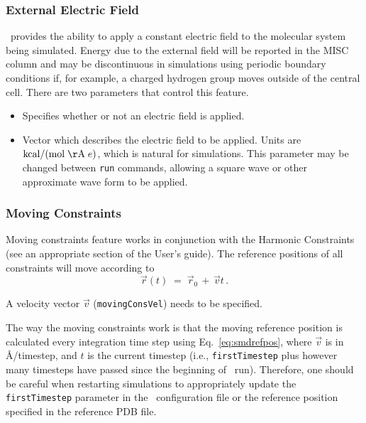 \subsubsection{External Electric Field}

\NAMD\ provides the ability to apply a constant electric field to the molecular
system being simulated.
Energy due to the external field will be reported in the MISC column
and may be discontinuous in simulations using periodic boundary conditions if,
for example, a charged hydrogen group moves outside of the central cell.
There are two parameters that control this feature.

\begin{itemize}

\item
{}
{Specifies whether or not an electric field is applied.}

\item
{}
{Vector which describes the electric field to be applied.
Units are ${\rm kcal} / ({\rm mol \; \AA} \; e)$, which is natural for simulations.
This parameter may be changed between {\tt run} commands, allowing a square
wave or other approximate wave form to be applied.}

\end{itemize}


\subsubsection{Moving Constraints}

Moving constraints feature works in conjunction with the Harmonic
Constraints (see an appropriate section of the User's guide).
The reference positions of all constraints
will move according to
\begin{equation}
\label{eq:smdrefpos}
   \vec r(t) \; = \; \vec r_0 \, + \, \vec v t \,.
\end{equation}

A velocity vector $\vec v$ ({\tt movingConsVel}) needs to be specified.

The way the moving constraints work is that the moving reference
position is calculated every integration time step using
Eq.~\ref{eq:smdrefpos}, where $\vec v$ is in \AA/timestep, and $t$ is the
current timestep (i.e., {\tt firstTimestep} plus however many
timesteps have passed since the beginning of \NAMD\ run). Therefore,
one should be careful when restarting simulations to appropriately
update the {\tt firstTimestep} parameter in the \NAMD\ configuration
file or the reference position specified in the reference PDB file.


